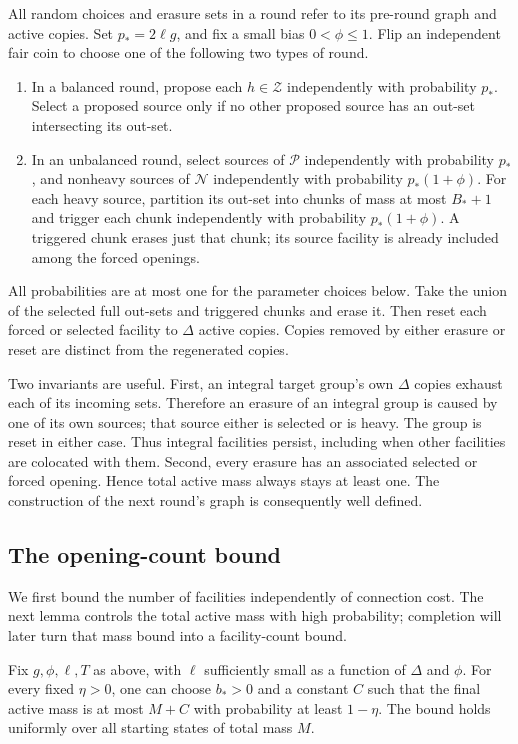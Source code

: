 All random choices and erasure sets in a round refer to its pre-round
graph and active copies.  Set $p_*=2\ell g$, and fix a small bias
$0<\phi\le1$.  Flip an independent fair coin to choose one of the following
two types of round.
\begin{enumerate}
\item In a balanced round, propose each $h\in\mathcal Z$ independently
with probability $p_*$.  Select a proposed source only if no other
proposed source has an out-set intersecting its out-set.
\item In an unbalanced round, select sources of $\mathcal P$
independently with probability $p_*$, and nonheavy sources of
$\mathcal N$ independently with probability $p_*(1+\phi)$.
For each heavy source, partition its out-set into chunks of mass at
most $B_*+1$ and trigger each chunk independently with probability
$p_*(1+\phi)$.  A triggered chunk erases just that chunk; its source
facility is already included among the forced openings.
\end{enumerate}
All probabilities are at most one for the parameter choices below.
Take the union of the selected full out-sets and triggered chunks and
erase it.  Then reset each forced or selected facility to $\Delta$
active copies.  Copies removed by either erasure or reset are distinct
from the regenerated copies.

Two invariants are useful.  First, an integral target group's own
$\Delta$ copies exhaust each of its incoming sets.  Therefore an
erasure of an integral group is caused by one of its own sources; that
source either is selected or is heavy.  The group is reset in either
case.  Thus integral facilities persist, including when other facilities
are colocated with them.  Second, every erasure has an associated
selected or forced opening.  Hence total active mass always stays at
least one.  The construction of the next round's graph is consequently
well defined.

\subsection{The opening-count bound}

We first bound the number of facilities independently of connection cost.
The next lemma controls the total active mass with high probability;
completion will later turn that mass bound into a facility-count bound.

\begin{lemma}\label{lem:rnd-count}
Fix $g,\phi,\ell,T$ as above, with $\ell$ sufficiently small as a
function of $\Delta$ and $\phi$.  For every fixed $\eta>0$, one can
choose $b_*>0$ and a constant $C$ such that the final active mass is at
most $M+C$ with probability at least $1-\eta$.  The bound holds
uniformly over all starting states of total mass $M$.
\end{lemma}

